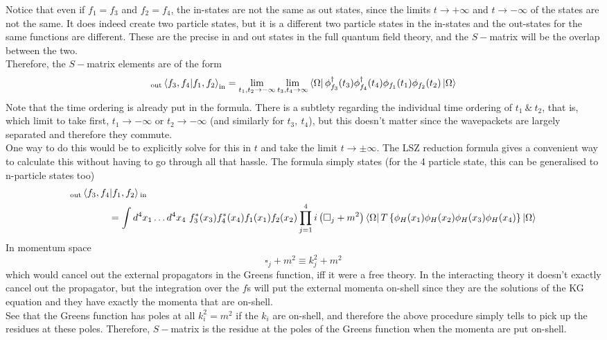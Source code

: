 \documentclass[11pt, notitlepage]{report}
\numberwithin{equation}{section}
\begin{document}
Notice that even if \(f_1 = f_3\) and \(f_2 = f_4\), the in-states are not the same as out states, since the limits \(t\to+\infty\) and \(t\to -\infty\) of the states are not the same. It does indeed create two particle states, but it is a different two particle states in the in-states and the out-states for the same functions are different. These are the precise in and out states in the full quantum field theory, and the \(S-\)matrix will be the overlap between the two. \\

Therefore, the \(S-\)matrix elements are of the form 
\begin{equation*}
    {}_{\text{out}}\braket{f_3, f_4|f_1, f_2}_{\text{in}} = \lim_{t_1, t_2 \to -\infty}\lim_{t_3,t_4\to \infty} \bra{\Omega} \phi_{f_3}^\dagger(t_3)\phi_{f_4}^\dagger(t_4)\phi_{f_1}(t_1)\phi_{f_2}(t_2)\ket{\Omega}
\end{equation*}
Note that the time ordering is already put in the formula. There is a subtlety regarding the individual time ordering of \(t_1 ~\&~ t_2\), that is, which limit to take first, \(t_1\to -\infty\) or \(t_2\to -\infty\) (and similarly for \(t_3,~t_4\)), but this doesn't matter since the wavepackets are largely separated and therefore they commute. \\

One way to do this would be to explicitly solve for this in \(t\) and take the limit \(t\to \pm \infty\). The LSZ reduction formula gives a convenient way to calculate this without having to go through all that hassle. The formula simply states (for the 4 particle state, this can be generalised to n-particle states too)
\begin{align*}
    &{}_{\text{out}}\braket{f_3, f_4|f_1, f_2}{}_{\text{in}} \\
    &~~~~~~~~~~~~= \int d^4x_1 \ldots d^4x_4 ~f_3^*(x_3)f_4^*(x_4)f_1(x_1)f_2(x_2) \prod_{j=1}^4i\left(\square_j + m^2 \right) \bra{\Omega}T\left\{ \phi_H(x_1)\phi_H(x_2)\phi_H(x_3)\phi_H(x_4) \right\}\ket{\Omega}
\end{align*}
In momentum space 
\begin{equation*}
    \square_j + m^2 \equiv k_j^2 + m^2
\end{equation*}
which would cancel out the external propagators in the Greens function, iff it were a free theory. In the interacting theory it doesn't exactly cancel out the propagator, but the integration over the \(f\)s will put the external momenta on-shell since they are the solutions of the KG equation and they have exactly the momenta that are on-shell. \\
See that the Greens function has poles at all \(k_i^2 = m^2\) if the \(k_i\) are on-shell, and therefore the above procedure simply tells to pick up the residues at these poles. Therefore, \(S-\)matrix is the residue at the poles of the Greens function when the momenta are put on-shell.\\
\end{document}
